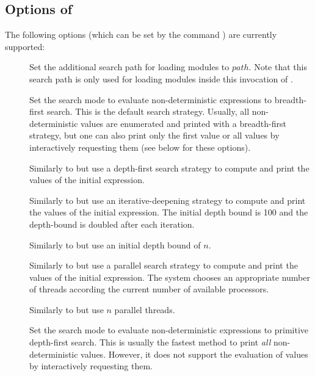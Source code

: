 \subsection{Options of \CYS}
\label{sec:options}

The following options (which can be set by the command )
are currently supported:

\begin{description}
\item[] Set the additional search path
for loading modules to $path$.
Note that this search path is only used for loading modules
inside this invocation of \CYS.

\item[]
Set the search mode to evaluate non-deterministic expressions
to breadth-first search.
This is the default search strategy.
Usually, all non-deterministic values
are enumerated and printed with a breadth-first strategy, but one can also
print only the first value or all values by interactively requesting them
(see below for these options).

\item[]
Similarly to  but use a depth-first search strategy
to compute and print the values of the initial expression.

\item[]
Similarly to  but use an iterative-deepening strategy
to compute and print the values of the initial expression.
The initial depth bound is 100 and the depth-bound is
doubled after each iteration.

\item[]
Similarly to  but use an initial depth bound of $n$.

\item[]
Similarly to  but use a parallel search strategy
to compute and print the values of the initial expression.
The system chooses an appropriate number
of threads according the current number of available processors.

\item[]
Similarly to  but use $n$ parallel threads.

\item[]
Set the search mode to evaluate non-deterministic expressions
to primitive depth-first search. This is usually the fastest method
to print \emph{all} non-deterministic values.
However, it does not support the evaluation of values
by interactively requesting them.


\end{description}
